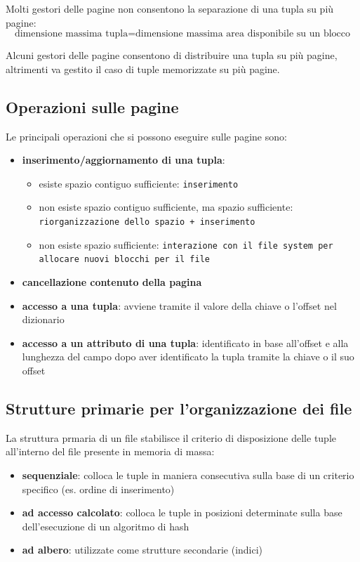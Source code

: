 Molti gestori delle pagine non consentono la separazione di una tupla su più pagine:
\begin{equation*}
  \text{dimensione massima tupla} = \text{dimensione massima area disponibile su un blocco}
\end{equation*}

Alcuni gestori delle pagine consentono di distribuire una tupla su più pagine, altrimenti va gestito il caso di tuple memorizzate su più pagine.

\subsection{Operazioni sulle pagine}
Le principali operazioni che si possono eseguire sulle pagine sono:
\begin{itemize}[label=$\triangleright$, itemsep=\smallskipamount]
  \item \textbf{inserimento/aggiornamento di una tupla}:
  \begin{itemize}[label=$\diamond$, itemsep=\smallskipamount]
    \item esiste spazio contiguo sufficiente: \texttt{inserimento}
    \item non esiste spazio contiguo sufficiente, ma spazio sufficiente: \texttt{riorganizzazione dello spazio + inserimento}
    \item non esiste spazio sufficiente: \texttt{interazione con il file system per allocare nuovi blocchi per il file}
  \end{itemize}
  \item \textbf{cancellazione contenuto della pagina}
  \item \textbf{accesso a una tupla}: avviene tramite il valore della chiave o l'offset nel dizionario
  \item \textbf{accesso a un attributo di una tupla}: identificato in base all’offset e alla lunghezza del campo dopo aver identificato la tupla tramite la chiave o il suo offset 
\end{itemize}


\subsection{Strutture primarie per l'organizzazione dei file}
La struttura prmaria di un file stabilisce il criterio di disposizione delle tuple all'interno del file presente in memoria di massa:
\begin{itemize}[label=$\triangleright$, itemsep=\smallskipamount]
  \item \textbf{sequenziale}: colloca le tuple in maniera consecutiva sulla base di un criterio specifico (es. ordine di inserimento)
  \item \textbf{ad accesso calcolato}: colloca le tuple in posizioni determinate sulla base dell'esecuzione di un algoritmo di hash
  \item \textbf{ad albero}: utilizzate come strutture secondarie (indici)
\end{itemize}

